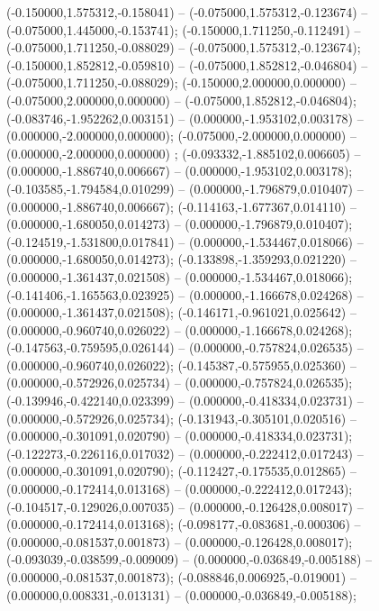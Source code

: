  (-0.150000,1.575312,-0.158041) -- (-0.075000,1.575312,-0.123674) -- (-0.075000,1.445000,-0.153741);
 (-0.150000,1.711250,-0.112491) -- (-0.075000,1.711250,-0.088029) -- (-0.075000,1.575312,-0.123674);
 (-0.150000,1.852812,-0.059810) -- (-0.075000,1.852812,-0.046804) -- (-0.075000,1.711250,-0.088029);
 (-0.150000,2.000000,0.000000) -- (-0.075000,2.000000,0.000000) -- (-0.075000,1.852812,-0.046804);
 (-0.083746,-1.952262,0.003151) -- (0.000000,-1.953102,0.003178) -- (0.000000,-2.000000,0.000000);
 (-0.075000,-2.000000,0.000000) -- (0.000000,-2.000000,0.000000) ;
 (-0.093332,-1.885102,0.006605) -- (0.000000,-1.886740,0.006667) -- (0.000000,-1.953102,0.003178);
 (-0.103585,-1.794584,0.010299) -- (0.000000,-1.796879,0.010407) -- (0.000000,-1.886740,0.006667);
 (-0.114163,-1.677367,0.014110) -- (0.000000,-1.680050,0.014273) -- (0.000000,-1.796879,0.010407);
 (-0.124519,-1.531800,0.017841) -- (0.000000,-1.534467,0.018066) -- (0.000000,-1.680050,0.014273);
 (-0.133898,-1.359293,0.021220) -- (0.000000,-1.361437,0.021508) -- (0.000000,-1.534467,0.018066);
 (-0.141406,-1.165563,0.023925) -- (0.000000,-1.166678,0.024268) -- (0.000000,-1.361437,0.021508);
 (-0.146171,-0.961021,0.025642) -- (0.000000,-0.960740,0.026022) -- (0.000000,-1.166678,0.024268);
 (-0.147563,-0.759595,0.026144) -- (0.000000,-0.757824,0.026535) -- (0.000000,-0.960740,0.026022);
 (-0.145387,-0.575955,0.025360) -- (0.000000,-0.572926,0.025734) -- (0.000000,-0.757824,0.026535);
 (-0.139946,-0.422140,0.023399) -- (0.000000,-0.418334,0.023731) -- (0.000000,-0.572926,0.025734);
 (-0.131943,-0.305101,0.020516) -- (0.000000,-0.301091,0.020790) -- (0.000000,-0.418334,0.023731);
 (-0.122273,-0.226116,0.017032) -- (0.000000,-0.222412,0.017243) -- (0.000000,-0.301091,0.020790);
 (-0.112427,-0.175535,0.012865) -- (0.000000,-0.172414,0.013168) -- (0.000000,-0.222412,0.017243);
 (-0.104517,-0.129026,0.007035) -- (0.000000,-0.126428,0.008017) -- (0.000000,-0.172414,0.013168);
 (-0.098177,-0.083681,-0.000306) -- (0.000000,-0.081537,0.001873) -- (0.000000,-0.126428,0.008017);
 (-0.093039,-0.038599,-0.009009) -- (0.000000,-0.036849,-0.005188) -- (0.000000,-0.081537,0.001873);
 (-0.088846,0.006925,-0.019001) -- (0.000000,0.008331,-0.013131) -- (0.000000,-0.036849,-0.005188);
